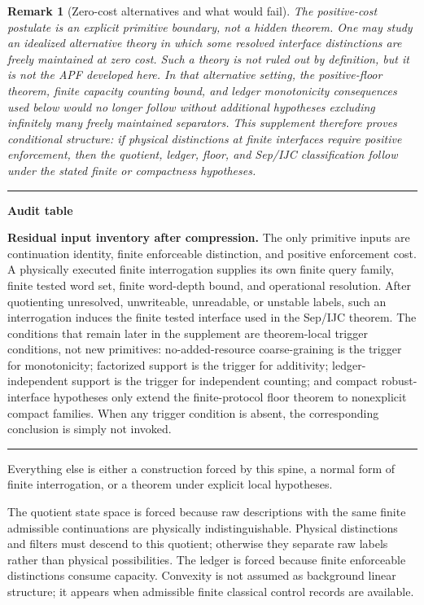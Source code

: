 \documentclass[11pt]{article}
\newtheorem{remark}[theorem]{Remark}
\newenvironment{auditbox}{\par\medskip\hrule\vspace{0.4em}\textbf{Audit table}\par\vspace{0.3em}}{\vspace{0.5em}\hrule\par\medskip}
\begin{document}
\begin{remark}[Zero-cost alternatives and what would fail]\label{rem:zero-cost-alternative}
The positive-cost postulate is an explicit primitive boundary, not a hidden theorem.  One may study an idealized alternative theory in which some resolved interface distinctions are freely maintained at zero cost.  Such a theory is not ruled out by definition, but it is not the APF developed here.  In that alternative setting, the positive-floor theorem, finite capacity counting bound, and ledger monotonicity consequences used below would no longer follow without additional hypotheses excluding infinitely many freely maintained separators.  This supplement therefore proves conditional structure: if physical distinctions at finite interfaces require positive enforcement, then the quotient, ledger, floor, and Sep/IJC classification follow under the stated finite or compactness hypotheses.
\end{remark}


\begin{auditbox}
\textbf{Residual input inventory after compression.}  The only primitive inputs are continuation identity, finite enforceable distinction, and positive enforcement cost.  A physically executed finite interrogation supplies its own finite query family, finite tested word set, finite word-depth bound, and operational resolution.  After quotienting unresolved, unwriteable, unreadable, or unstable labels, such an interrogation induces the finite tested interface used in the Sep/IJC theorem.  The conditions that remain later in the supplement are theorem-local trigger conditions, not new primitives: no-added-resource coarse-graining is the trigger for monotonicity; factorized support is the trigger for additivity; ledger-independent support is the trigger for independent counting; and compact robust-interface hypotheses only extend the finite-protocol floor theorem to nonexplicit compact families.  When any trigger condition is absent, the corresponding conclusion is simply not invoked.
\end{auditbox}

Everything else is either a construction forced by this spine, a normal form of finite interrogation, or a theorem under explicit local hypotheses.

The quotient state space is forced because raw descriptions with the same finite admissible continuations are physically indistinguishable.  Physical distinctions and filters must descend to this quotient; otherwise they separate raw labels rather than physical possibilities.  The ledger is forced because finite enforceable distinctions consume capacity.  Convexity is not assumed as background linear structure; it appears when admissible finite classical control records are available.
\end{document}
